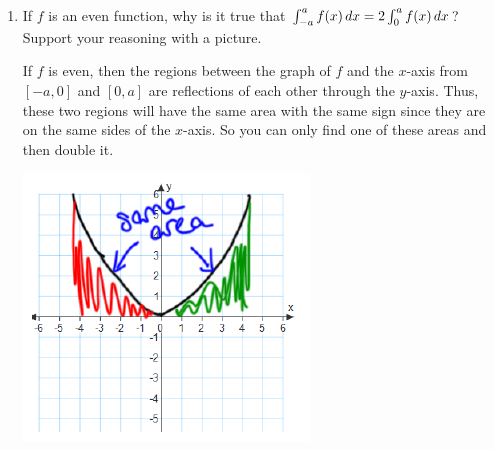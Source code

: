 \documentclass[nooutcomes]{ximera}
\begin{document}
\begin{problem}
\begin{enumerate}
    \item
      If $f$ is an even function, why is it true that $\int_{-a}^a f(x) \,d x = 2 \int_0^a f(x) \,d x$?
      Support your reasoning with a picture.
      \begin{freeResponse}
        If $f$ is even, then the regions between the graph of $f$ and the $x$-axis from $[-a,0]$ and $[0,a]$ are reflections of each other through the $y$-axis.
        Thus, these two regions will have the same area with the same sign since they are on the same sides of the $x$-axis.
        So you can only find one of these areas and then double it.
      \begin{image}
        \includegraphics[scale=.7]{Images/Figure2.png}
      \end{image}
    \end{freeResponse}
    \end{enumerate}
\end{problem}
\end{document}
